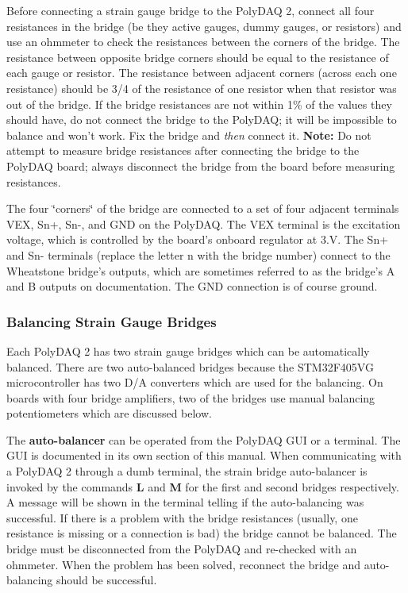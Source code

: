 Before connecting a strain gauge bridge to the Poly\-D\-A\-Q 2, connect all four resistances in the bridge (be they active gauges, dummy gauges, or resistors) and use an ohmmeter to check the resistances between the corners of the bridge. The resistance between opposite bridge corners should be equal to the resistance of each gauge or resistor. The resistance between adjacent corners (across each one resistance) should be 3/4 of the resistance of one resistor when that resistor was out of the bridge. If the bridge resistances are not within 1\% of the values they should have, {\ttfamily do} {\ttfamily not} connect the bridge to the Poly\-D\-A\-Q; it will be impossible to balance and won't work. Fix the bridge and {\itshape then} connect it. {\bfseries Note\-:} Do not attempt to measure bridge resistances after connecting the bridge to the Poly\-D\-A\-Q board; always disconnect the bridge from the board before measuring resistances.

The four \char`\"{}corners\char`\"{} of the bridge are connected to a set of four adjacent terminals {\ttfamily V\-E\-X}, {\ttfamily Sn+}, {\ttfamily Sn-\/}, and {\ttfamily G\-N\-D} on the Poly\-D\-A\-Q. The {\ttfamily V\-E\-X} terminal is the excitation voltage, which is controlled by the board's onboard regulator at 3.\-V. The {\ttfamily Sn+} and {\ttfamily Sn-\/} terminals (replace the letter {\ttfamily n} with the bridge number) connect to the Wheatstone bridge's outputs, which are sometimes referred to as the bridge's {\ttfamily A} and {\ttfamily B} outputs on documentation. The {\ttfamily G\-N\-D} connection is of course ground.\hypertarget{pd_sensors_sss_sg_bal}{}\subsubsection{Balancing Strain Gauge Bridges}\label{pd_sensors_sss_sg_bal}
Each Poly\-D\-A\-Q 2 has two strain gauge bridges which can be automatically balanced. There are two auto-\/balanced bridges because the S\-T\-M32\-F405\-V\-G microcontroller has two D/\-A converters which are used for the balancing. On boards with four bridge amplifiers, two of the bridges use manual balancing potentiometers which are discussed below.

The {\bfseries auto-\/balancer} can be operated from the Poly\-D\-A\-Q G\-U\-I or a terminal. The G\-U\-I is documented in its own section of this manual. When communicating with a Poly\-D\-A\-Q 2 through a dumb terminal, the strain bridge auto-\/balancer is invoked by the commands {\bfseries L} and {\bfseries M} for the first and second bridges respectively. A message will be shown in the terminal telling if the auto-\/balancing was successful. If there is a problem with the bridge resistances (usually, one resistance is missing or a connection is bad) the bridge cannot be balanced. The bridge must be disconnected from the Poly\-D\-A\-Q and re-\/checked with an ohmmeter. When the problem has been solved, reconnect the bridge and auto-\/balancing should be successful.

